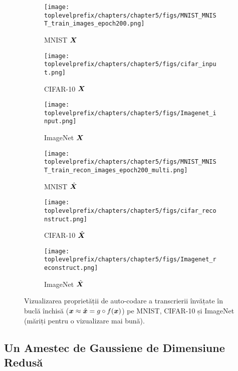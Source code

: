 \documentclass[../../book-main_ro.tex]{subfiles}
\begin{document}
\begin{figure}[t]
    \begin{subfigure}[t]{0.3\textwidth}
        \centering
        \texttt{[image: \\toplevelprefix/chapters/chapter5/figs/MNIST\_MNIST\_train\_images\_epoch200.png]}
        \caption{{\small MNIST $\bm{X}$}}
    \end{subfigure}
    \hfill
    \begin{subfigure}[t]{0.3\textwidth}
        \centering
        \texttt{[image: \\toplevelprefix/chapters/chapter5/figs/cifar\_input.png]}
        \caption{{\small CIFAR-10 $\bm{X}$}}
    \end{subfigure}
    \hfill
    \begin{subfigure}[t]{0.3\textwidth}
        \centering
        \texttt{[image: \\toplevelprefix/chapters/chapter5/figs/Imagenet\_input.png]}
        \caption{{\small ImageNet $\bm{X}$}}
    \end{subfigure}

    \begin{subfigure}[t]{0.3\textwidth}
        \centering
        \texttt{[image: \\toplevelprefix/chapters/chapter5/figs/MNIST\_MNIST\_train\_recon\_images\_epoch200\_multi.png]}
        \caption{{\small MNIST $\hat{\bm{X}}$}}
    \end{subfigure}
    \hfill
    \begin{subfigure}[t]{0.3\textwidth}
        \centering
        \texttt{[image: \\toplevelprefix/chapters/chapter5/figs/cifar\_reconstruct.png]}
        \caption{{\small CIFAR-10 $\hat{\bm{X}}$}}
    \end{subfigure}
    \hfill
    \begin{subfigure}[t]{0.3\textwidth}
        \centering
        \texttt{[image: \\toplevelprefix/chapters/chapter5/figs/Imagenet\_reconstruct.png]}
        \caption{{\small ImageNet $\hat{\bm{X}}$}}
    \end{subfigure}
    \caption{Vizualizarea proprietății de auto-codare a transcrierii învățate în buclă închisă \mbox{($\bm{x} \approx \hat{\bm{x}} = g\circ f(\bm{x})$)} pe MNIST, CIFAR-10 și ImageNet (măriți pentru o vizualizare mai bună).}
    \label{fig:justify_xhat_equals_x}
\end{figure}


\subsection{Un Amestec de Gaussiene de Dimensiune Redusă}
\end{document}
